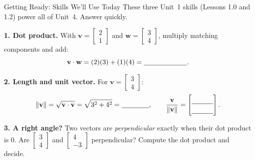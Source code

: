 \documentclass[10pt]{article}
\newcommand{\vv}{\mathbf{v}}
\newcommand{\ww}{\mathbf{w}}
\begin{document}
\namedateperiod

\vspace{0.12in}

\begin{notesbox}{Getting Ready: Skills We'll Use Today}
\small These three Unit~1 skills (Lessons 1.0 and 1.2) power all of Unit~4. Answer quickly.

\vspace{4pt}
\textbf{1. Dot product.} With $\vv=\begin{bmatrix} 2 \\ 1 \end{bmatrix}$ and
$\ww=\begin{bmatrix} 3 \\ 4 \end{bmatrix}$, multiply matching components and add:
\[
  \vv\cdot\ww = (2)(3) + (1)(4) = \blank{2.2cm}.
\]

\vspace{4pt}
\textbf{2. Length and unit vector.} For $\vv=\begin{bmatrix} 3 \\ 4 \end{bmatrix}$:
\[
  \|\vv\| = \sqrt{\vv\cdot\vv} = \sqrt{3^2+4^2} = \blank{1.4cm},
  \qquad
  \frac{\vv}{\|\vv\|} = \begin{bmatrix}\rule{0pt}{1.1em}\blank{1.1cm}\\[2pt]\blank{1.1cm}\end{bmatrix}.
\]

\vspace{4pt}
\textbf{3. A right angle?} Two vectors are \emph{perpendicular} exactly when their dot product is
$0$. Are $\begin{bmatrix} 3 \\ 4 \end{bmatrix}$ and $\begin{bmatrix} 4 \\ -3 \end{bmatrix}$
perpendicular? Compute the dot product and decide.
\writeline
\end{notesbox}
\end{document}

